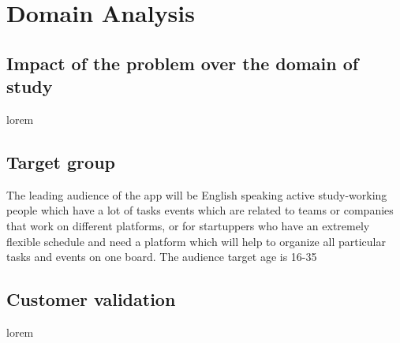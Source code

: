\section{Domain Analysis}

\subsection{Impact of the problem over the domain of study}
\par lorem

\subsection{Target group}
\par The leading audience of the app will be English speaking active study-working people which have a lot of tasks events which are related to teams or companies that work on different platforms, or for startuppers who have an extremely flexible schedule and need a platform which will help to organize all particular tasks and events on one board. The audience target age is 16-35 

\subsection{Customer validation}
\par lorem

